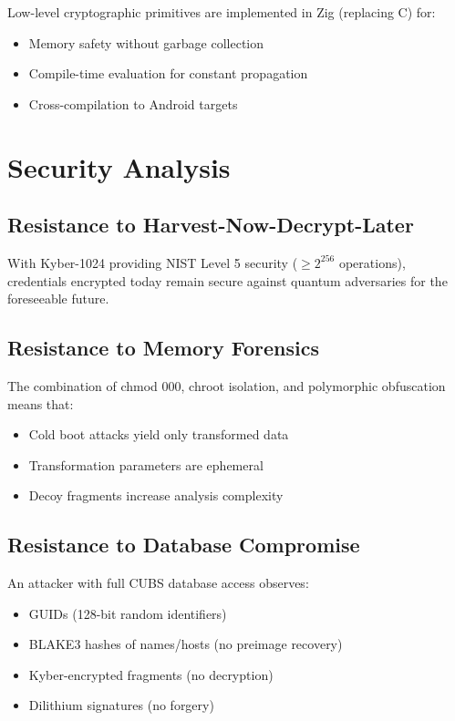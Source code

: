 \documentclass[11pt,a4paper]{article}
\begin{document}
Low-level cryptographic primitives are implemented in Zig (replacing C) for:
\begin{itemize}
    \item Memory safety without garbage collection
    \item Compile-time evaluation for constant propagation
    \item Cross-compilation to Android targets
\end{itemize}

\section{Security Analysis}

\subsection{Resistance to Harvest-Now-Decrypt-Later}

With Kyber-1024 providing NIST Level 5 security ($\geq 2^{256}$ operations), credentials encrypted today remain secure against quantum adversaries for the foreseeable future.

\subsection{Resistance to Memory Forensics}

The combination of chmod 000, chroot isolation, and polymorphic obfuscation means that:
\begin{itemize}
    \item Cold boot attacks yield only transformed data
    \item Transformation parameters are ephemeral
    \item Decoy fragments increase analysis complexity
\end{itemize}

\subsection{Resistance to Database Compromise}

An attacker with full CUBS database access observes:
\begin{itemize}
    \item GUIDs (128-bit random identifiers)
    \item BLAKE3 hashes of names/hosts (no preimage recovery)
    \item Kyber-encrypted fragments (no decryption)
    \item Dilithium signatures (no forgery)
\end{itemize}
\end{document}

